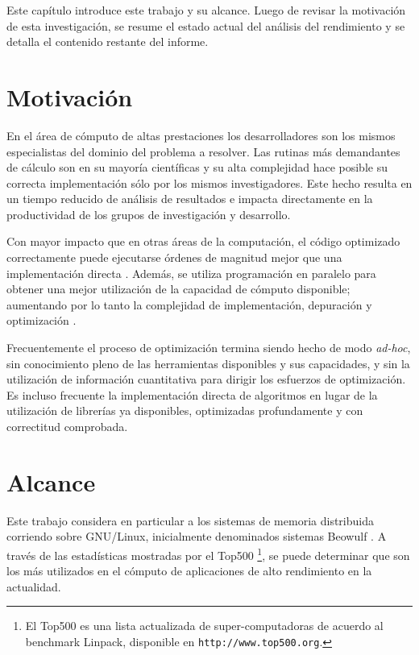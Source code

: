 \documentclass[a4paper]{report}
\begin{document}
Este capítulo introduce este trabajo y su alcance. Luego de revisar la
motivación de esta investigación, se resume el estado actual del análisis
del rendimiento y se detalla el contenido restante del informe.

\section{Motivación}

En el área de cómputo de altas prestaciones los desarrolladores son los mismos
especialistas del dominio del problema a resolver. Las rutinas
más demandantes de cálculo son en su mayoría científicas y su
alta complejidad hace posible su correcta implementación sólo por los mismos investigadores.
Este hecho resulta en un tiempo reducido de análisis de resultados
e impacta directamente en la productividad de los grupos de investigación y
desarrollo.

\bigskip

Con mayor impacto que en otras áreas de la computación, el código
optimizado correctamente puede ejecutarse órdenes de magnitud mejor que una implementación
directa \cite{mm-matrixmultiplicationtool}. Además, se utiliza
programación en paralelo para obtener una mejor utilización de la
capacidad de cómputo disponible; aumentando por lo tanto la complejidad de
implementación, depuración y optimización \cite{parallel-programming}.

\bigskip

Frecuentemente el proceso de optimización termina siendo
hecho de modo {\it ad-hoc}, sin conocimiento pleno de las herramientas disponibles y
sus capacidades, y sin la utilización de información cuantitativa para dirigir los
esfuerzos de optimización. Es incluso frecuente la implementación directa
de algoritmos en lugar de la utilización de librerías ya disponibles, optimizadas
profundamente y con correctitud comprobada.

\section{Alcance}

Este trabajo considera en particular a los sistemas de memoria distribuida corriendo sobre
GNU/Linux, inicialmente denominados sistemas Beowulf \cite{beowulf}. A través de las
estadísticas mostradas por el Top500 \footnote{El Top500 es una lista actualizada de super-computadoras
de acuerdo al benchmark Linpack, disponible en {\tt http://www.top500.org}.}, se
puede determinar que son los más utilizados en el cómputo de aplicaciones de alto rendimiento en la actualidad.
\end{document}
